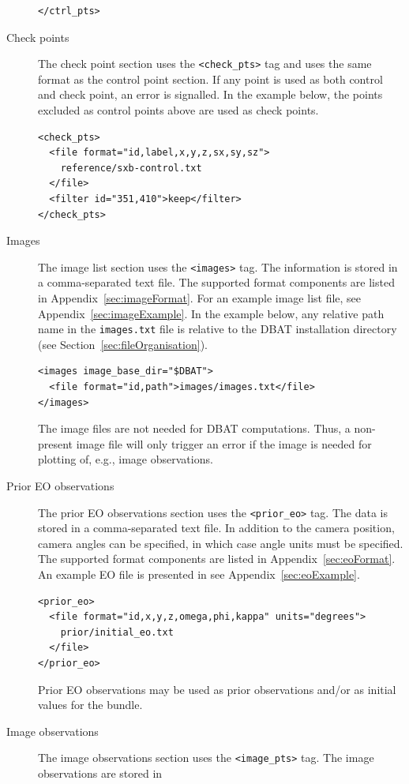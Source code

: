 \documentclass{article}
\begin{document}
\begin{description}
\begin{verbatim}
</ctrl_pts>
\end{verbatim}
\item[{Check points}] The check point section uses the \texttt{<check\_pts>} tag
and uses the same format as the control point
section. If any point is used as both control and
check point, an error is signalled. In the example
below, the points excluded as control points above
are used as check points.
\begin{verbatim}
<check_pts>
  <file format="id,label,x,y,z,sx,sy,sz">
    reference/sxb-control.txt
  </file>
  <filter id="351,410">keep</filter>
</check_pts>
\end{verbatim}
\item[{Images}] The image list section uses the \texttt{<images>} tag. The
information is stored in a comma-separated text file. The
supported format components are listed in
Appendix~\ref{sec:imageFormat}. For an example image list
file, see Appendix~\ref{sec:imageExample}. In the example
below, any relative path name in the \texttt{images.txt} file is
relative to the DBAT installation directory (see
Section~\ref{sec:fileOrganisation}).
\begin{verbatim}
<images image_base_dir="$DBAT">
  <file format="id,path">images/images.txt</file>
</images>
\end{verbatim}
The image files are not needed for DBAT computations.
Thus, a non-present image file will only trigger an error
if the image is needed for plotting of, e.g., image
observations.
\item[{Prior EO observations}] The prior EO observations section uses the
\texttt{<prior\_eo>} tag. The data is stored in a comma-separated text
file. In addition to the camera position, camera angles can be
specified, in which case angle units must be specified. The
supported format components are listed in
Appendix~\ref{sec:eoFormat}. An example EO file is presented in
see Appendix~\ref{sec:eoExample}.
\begin{verbatim}
<prior_eo>
  <file format="id,x,y,z,omega,phi,kappa" units="degrees">
    prior/initial_eo.txt
  </file>
</prior_eo>
\end{verbatim}
Prior EO observations may be used as prior observations and/or as
initial values for the bundle.
\item[{Image observations}] The image observations section uses the
\texttt{<image\_pts>} tag. The image observations are stored in

\end{description}
\end{document}
